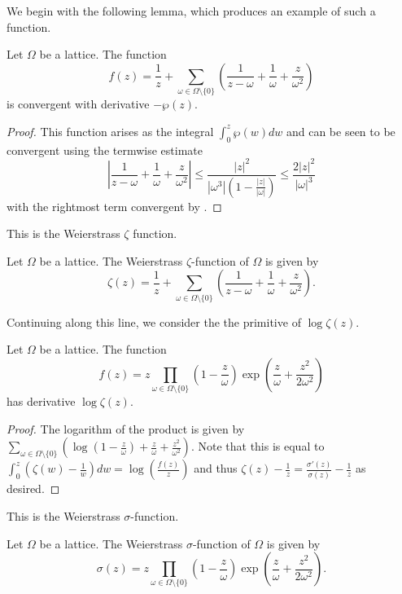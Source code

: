 We begin with the following lemma, which produces an example of such a function. 
\begin{lemma}\label{lem: Weierstrass zeta function}
    Let $\Omega$ be a lattice. The function 
    $$f(z)=\frac{1}{z}+\sum_{\omega\in\Omega\setminus\{0\}}\left(\frac{1}{z-\omega}+\frac{1}{\omega}+\frac{z}{\omega^{2}}\right)$$
    is convergent with derivative $-\wp(z)$. 
\end{lemma}
\begin{proof}
    This function arises as the integral $\int_{0}^{z}\wp(w)dw$ and can be seen to be convergent using the termwise estimate 
    $$\left|\frac{1}{z-\omega}+\frac{1}{\omega}+\frac{z}{\omega^{2}}\right|\leq\frac{|z|^{2}}{|\omega^{3}|\left(1-\frac{|z|}{|\omega|}\right)}\leq\frac{2|z|^{2}}{|\omega|^{3}}$$
    with the rightmost term convergent by . 
\end{proof}
This is the Weierstrass $\zeta$ function. 
\begin{definition}\label{def: Weierstrass zeta function}
    Let $\Omega$ be a lattice. The Weierstrass $\zeta$-function of $\Omega$ is given by 
    $$\zeta(z)=\frac{1}{z}+\sum_{\omega\in\Omega\setminus\{0\}}\left(\frac{1}{z-\omega}+\frac{1}{\omega}+\frac{z}{\omega^{2}}\right).$$
\end{definition}
Continuing along this line, we consider the the primitive of $\log\zeta(z)$. 
\begin{lemma}\label{lem: Weierstrass sigma function}
    Let $\Omega$ be a lattice. The function 
    $$f(z)=z\prod_{\omega\in\Omega\setminus\{0\}}\left(1-\frac{z}{\omega}\right)\exp\left(\frac{z}{\omega}+\frac{z^{2}}{2\omega^{2}}\right)$$
    has derivative $\log\zeta(z)$. 
\end{lemma}
\begin{proof}
    The logarithm of the product is given by $\sum_{\omega\in\Omega\setminus\{0\}}\left(\log\left(1-\frac{z}{\omega}\right)+\frac{z}{\omega}+\frac{z^{2}}{\omega^{2}}\right).$ Note that this is equal to $\int_{0}^{z}(\zeta(w)-\frac{1}{w})dw=\log\left(\frac{f(z)}{z}\right)$ and thus $\zeta(z)-\frac{1}{z}=\frac{\sigma'(z)}{\sigma(z)}-\frac{1}{z}$ as desired. 
\end{proof}
This is the Weierstrass $\sigma$-function. 
\begin{definition}\label{def: Weierstrass sigma function}
    Let $\Omega$ be a lattice. The Weierstrass $\sigma$-function of $\Omega$ is given by 
    $$\sigma(z)=z\prod_{\omega\in\Omega\setminus\{0\}}\left(1-\frac{z}{\omega}\right)\exp\left(\frac{z}{\omega}+\frac{z^{2}}{2\omega^{2}}\right).$$
\end{definition}
